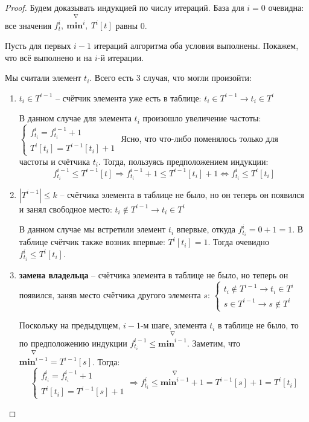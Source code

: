 \documentclass[a4paper,12pt]{article}
\begin{document}
\begin{proof}
    Будем доказывать индукцией по числу итераций. База для $i = 0$ очевидна: все значения $f_t^i,\ \overset{\nabla}{\textbf{min}^i},\ T^i[t]$ равны 0.
    
    Пусть для первых $i - 1$ итераций алгоритма оба условия выполнены. Покажем, что всё выполнено и на $i$-й итерации. 
    
    Мы считали элемент $t_i$. Всего есть 3 случая, что могли произойти:
    \begin{enumerate}
        \item $t_i \in T^{i - 1}$ -- счётчик элемента уже есть в таблице: $t_i \in T^{i - 1} \rightarrow t_i \in T^i$ 
        
        В данном случае для элемента $t_i$ произошло увеличение частоты: $\begin{cases}f_{t_i}^i = f_{t_i}^{i - 1} + 1\\T^i[t_i] = T^{i - 1}[t_i] + 1 \end{cases}$ Ясно, что что-либо поменялось только для частоты и счётчика $t_i$. Тогда, пользуясь предположением индукции:
        \[f_{t_i}^{i - 1} \leqslant T^{i - 1}[t] \Longrightarrow f_{t_i}^{i - 1} + 1 \leqslant T^{i - 1}[t_i] + 1 \iff f_{t_i}^i \leqslant T^i[t_i]\]
        
        \item $|T^{i - 1}| \leqslant k$ -- счётчика элемента в таблице не было, но он теперь он появился и занял свободное место: $t_i \notin T^{i - 1} \rightarrow t_i \in T^i$
        
        В данном случае мы встретили элемент $t_i$ впервые, откуда $f_{t_i}^i = 0 + 1 = 1$. В таблице счётчик также возник впервые: $T^i[t_i] = 1$. Тогда очевидно $f_{t_i}^i\leqslant T^i[t_i]$.
        
        \item \textbf{замена владельца} -- счётчика элемента в таблице не было, но теперь он появился, заняв место счётчика другого элемента $s$: $\begin{cases}t_i \notin T^{i - 1} \rightarrow t_i \in T^i\\s \in T^{i - 1} \rightarrow s \notin T^i\end{cases}$
        
        Поскольку на предыдущем, $i - 1$-м шаге, элемента $t_i$ в таблице не было, то по предположению индукции $f_{t_i}^{i - 1} \leqslant \overset{\nabla}{\textbf{min}^{i - 1}}$. Заметим, что $\overset{\nabla}{\textbf{min}^{i - 1}} = T^{i - 1}[s]$. Тогда:
        \[\begin{cases}f_{t_i}^i = f_{t_i}^{i - 1} + 1\\ T^i[t_i] = T^{i - 1}[s] + 1 \end{cases} \Longrightarrow f_{t_i}^i \leqslant \overset{\nabla}{\textbf{min}^{i - 1}} + 1 = T^{i - 1}[s] + 1 = T^i[t_i]\]
        

\end{enumerate}
\end{proof}
\end{document}
